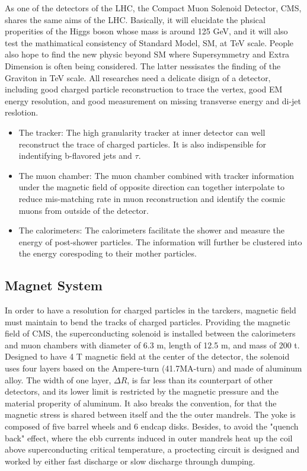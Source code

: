 As one of the detectors of the LHC, the Compact Muon Solenoid Detector, CMS, shares the same aims of the LHC.
Basically, it will elucidate the phsical properities of the Higgs boson whose mass is around 125 GeV, and it will also test the mathimatical consistency of Standard Model, SM, at TeV scale.
People also hope to find the new physic beyond SM where Supersymmetry and Extra Dimension is often being considered. The latter nessisates the finding of the Graviton in TeV scale.
All researches need a delicate disign of a detector, including good charged particle reconstruction to trace the vertex, good EM energy resolution, and good measurement on missing transverse energy and di-jet reslotion.
\begin{itemize}
\item The tracker: The high granularity tracker at inner detector can well reconstruct the trace of charged particles. It is also indispensible for indentifying b-flavored jets and $\tau$.  
\item The muon chamber: The muon chamber combined with tracker information under the magnetic field of opposite direction can together interpolate to reduce mis-matching rate in muon reconstruction and identify the cosmic muons from outside of the detector.
\item The calorimeters: The calorimeters facilitate the shower and measure the energy of post-shower particles. The information will further be clustered into the energy corespoding to their mother particles.
\end{itemize}

\subsection{Magnet System} 
In order to have a resolution for charged particles in the tarckers, magnetic field must maintain to bend the tracks of charged particles. 
Providing the magnetic field of CMS, the superconducting solenoid is installed between the calorimeters and muon chambers with diameter of 6.3 m, length of 12.5 m, and mass of 200 t. 
Designed to have 4 T magnetic field at the center of the detector, the solenoid uses four layers based on the Ampere-turn (41.7MA-turn) and made of aluminum alloy.
The width of one layer, $\Delta R$, is far less than its counterpart of other detectors, and its lower limit is restricted by the magnetic pressure and the material properity of aluminum.
It also breaks the convention, for that the magnetic stress is shared between itself and the the outer mandrels. 
The yoke is composed of five barrel wheels and 6 endcap disks. 
Besides, to avoid the "quench back" effect, where the ebb currents induced in outer mandrels heat up the coil above superconducting critical temperature, 
a proctecting circuit is designed and worked by either fast discharge or slow discharge throungh dumping. 

